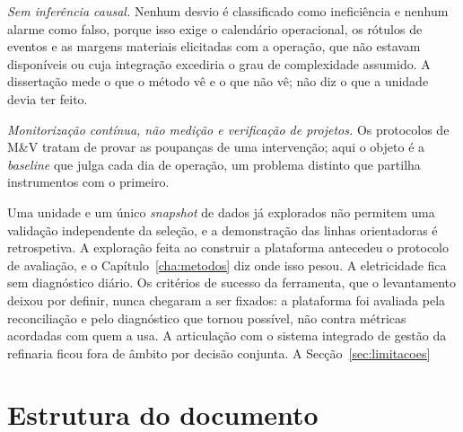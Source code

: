 
\emph{Sem inferência causal.} Nenhum desvio é classificado como
ineficiência e nenhum alarme como falso, porque isso exige o calendário
operacional, os rótulos de eventos e as margens materiais elicitadas
com a operação, que não estavam disponíveis ou cuja integração excediria o grau de complexidade assumido. A dissertação mede o que o
método vê e o que não vê; não diz o que a unidade devia ter feito.

\emph{Monitorização contínua, não medição e verificação de projetos.}
Os protocolos de M\&V tratam de provar as poupanças de uma intervenção;
aqui o objeto é a \emph{baseline} que julga cada dia de operação, um
problema distinto que partilha instrumentos com o primeiro.

 Uma unidade e um único
\emph{snapshot} de dados já explorados não permitem uma validação
independente da seleção, e a demonstração das linhas orientadoras é
retrospetiva. A exploração feita ao construir a plataforma
antecedeu o protocolo de avaliação, e o Capítulo~\ref{cha:metodos} diz
onde isso pesou. A
eletricidade fica sem diagnóstico diário. Os
critérios de sucesso da ferramenta, que o levantamento deixou por
definir, nunca chegaram a ser fixados: a plataforma foi avaliada pela
reconciliação e pelo diagnóstico que tornou possível, não contra
métricas acordadas com quem a usa. A articulação com o sistema integrado
de gestão da refinaria ficou fora de âmbito por decisão conjunta. A
Secção~\ref{sec:limitacoes} 

\section{Estrutura do documento}
\label{sec:estrutura}

